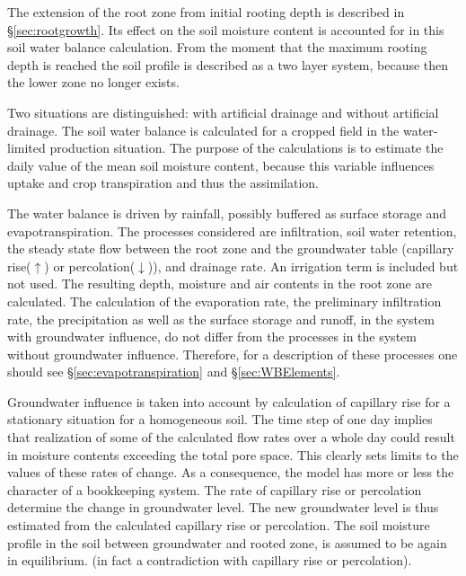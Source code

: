 The extension of the root zone from initial rooting depth is described in \S \ref{sec:rootgrowth}. 
Its effect on the soil moisture content is accounted for in this soil water balance calculation.
From the moment that the maximum rooting depth is reached the soil profile is described
as a two layer system, because then the lower zone no longer exists.

Two situations are distinguished: with artificial drainage and without artificial drainage.
The soil water balance is calculated for a cropped field in the water-limited production
situation. The purpose of the calculations is to estimate the daily value of the mean soil
moisture content, because this variable influences uptake and crop transpiration and thus
the assimilation.

The water balance is driven by rainfall, possibly buffered as surface storage and
evapotranspiration. The processes considered are infiltration, soil water retention, the
steady state flow between the root zone and the groundwater table (capillary rise($\uparrow$) or
percolation($\downarrow$)), and drainage rate. An irrigation term is included but not used. The
resulting depth, moisture and air contents in the root zone are calculated. The calculation
of the evaporation rate, the preliminary infiltration rate, the precipitation as well as the
surface storage and runoff, in the system with groundwater influence, do not differ from
the processes in the system without groundwater influence. Therefore, for a description of
these processes one should see \S \ref{sec:evapotranspiration} and \S \ref{sec:WBElements}.

Groundwater influence is taken into account by calculation of capillary rise for a
stationary situation for a homogeneous soil. The time step of one day implies that
realization of some of the calculated flow rates over a whole day could result in moisture
contents exceeding the total pore space. This clearly sets limits to the values of these rates
of change. As a consequence, the model has more or less the character of a bookkeeping
system. The rate of capillary rise or percolation determine the change in groundwater
level. The new groundwater level is thus estimated from the calculated capillary rise or
percolation. The soil moisture profile in the soil between groundwater and rooted zone, is
assumed to be again in equilibrium. (in fact a contradiction with capillary rise or
percolation).

